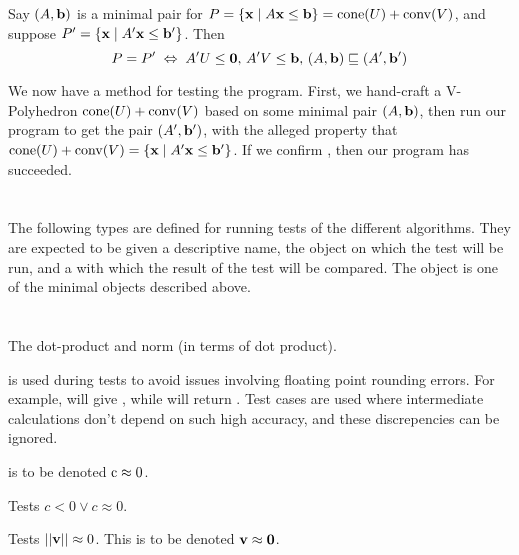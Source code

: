 \begin{EqCriteria}\label{eq_vp_hp}
	Say $(A,\mathbf{b})$ is a minimal pair for $P = \left\{\mathbf{x}\;|\; A\mathbf{x}\leq \mathbf{b}\right\} = \operatorname{cone}(U) + \operatorname{conv}(V)$, and suppose $P' = \left\{\mathbf{x}\;|\; A'\mathbf{x}\leq \mathbf{b}'\right\}$.  Then
	\[ P = P' \;\Leftrightarrow\; A'U\leq\mathbf{0},\, A'V\leq\mathbf{b},\, (A,\mathbf{b})\sqsubseteq (A',\mathbf{b}')\]
\end{EqCriteria}

\begin{Test}\label{test_vp_to_hp}
	We now have a method for testing the program.  First, we hand-craft a V-Polyhedron $\operatorname{cone}(U) + \operatorname{conv}(V)$ based on some minimal pair $(A,\mathbf{b})$, then run our program to get the pair $(A',\mathbf{b}')$, with the alleged property that $\operatorname{cone}(U) + \operatorname{conv}(V) = \left\{\mathbf{x}\;|\; A'\mathbf{x}\leq \mathbf{b}'\right\}$.  If we confirm , then our program has succeeded.
\end{Test}

\section{}

The following types are defined for running tests of the different algorithms.  They are expected to be given a descriptive name, the object on which the test will be run, and a  with which the result of the test will be compared.  The  object is one of the minimal objects described above.
\lsthconetestcasea
\lstvconetestcasea
\lsthpolytestcaseb
\lstvpolytestcaseb

\section{}

The dot-product and norm (in terms of dot product).
\lstoperator
\lstnorm

 is used during tests to avoid issues involving floating point rounding errors.  For example,  will give , while  will return .  Test cases are used where intermediate calculations don't depend on such high accuracy, and these discrepencies can be ignored.

 is to be denoted $\mli{c} \approx 0$.
\lstapproximatelyzeroa

Tests $c < 0 \lor c \approx 0$.
\lstapproximatelyltzero

Tests $\left|\left|\mathbf{v}\right|\right| \approx 0$.  This is to be denoted $\mathbf{v} \approx \mathbf{0}$.
\lstapproximatelyzerob

